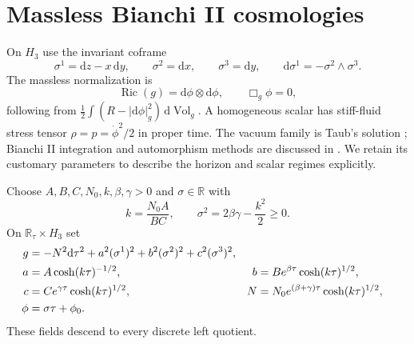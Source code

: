 \documentclass[10pt,a4paper]{article}
\numberwithin{equation}{section}
\theoremstyle{definition}
\theoremstyle{remark}
\newcommand{\R}{\mathbb R}
\newcommand{\dd}{\mathrm d}
\newcommand{\Vol}{\operatorname{Vol}}
\newcommand{\Ric}{\operatorname{Ric}}
\begin{document}
\section{Massless Bianchi II cosmologies}
\label{sec:einstein-scalar}

On $H_3$ use the invariant coframe
\begin{equation}
 \sigma^1=\dd z-x\,\dd y,\qquad
 \sigma^2=\dd x,\qquad \sigma^3=\dd y,\qquad
 \dd\sigma^1=-\sigma^2\wedge\sigma^3.
 \label{eq:heisenberg-coframe}
\end{equation}
The massless normalization is
\begin{equation}
 \Ric(g)=\dd\phi\otimes\dd\phi,\qquad \Box_g\phi=0,
 \label{eq:einstein-scalar}
\end{equation}
following from $\frac12\int(R-|\dd\phi|_g^2)\,\dd\Vol_g$.
A homogeneous scalar has stiff-fluid stress tensor
$\rho=p=\dot\phi^2/2$ in proper time.  The vacuum family is
Taub's solution \cite{Taub1951}; Bianchi II integration and
automorphism methods are discussed in
\cite{ChristodoulakisEtAl2001}.  We retain its customary parameters
to describe the horizon and scalar regimes explicitly.

Choose $A,B,C,N_0,k,\beta,\gamma>0$ and $\sigma\in\R$ with
\begin{equation}
 k=\frac{N_0A}{BC},\qquad
 \sigma^2=2\beta\gamma-\frac{k^2}{2}\ge0.
 \label{eq:scalar-parameters}
\end{equation}
On $\R_\tau\times H_3$ set
\begin{align}
 g&=-N^2\dd\tau^2+a^2(\sigma^1)^2+
 b^2(\sigma^2)^2+c^2(\sigma^3)^2,\notag\\
 a&=A\cosh(k\tau)^{-1/2},&
 b&=B e^{\beta\tau}\cosh(k\tau)^{1/2},\notag\\
 c&=C e^{\gamma\tau}\cosh(k\tau)^{1/2},&
 N&=N_0e^{(\beta+\gamma)\tau}\cosh(k\tau)^{1/2},\notag\\
 \phi&=\sigma\tau+\phi_0.
 \label{eq:scalar-family}
\end{align}
These fields descend to every discrete left quotient.
\end{document}
